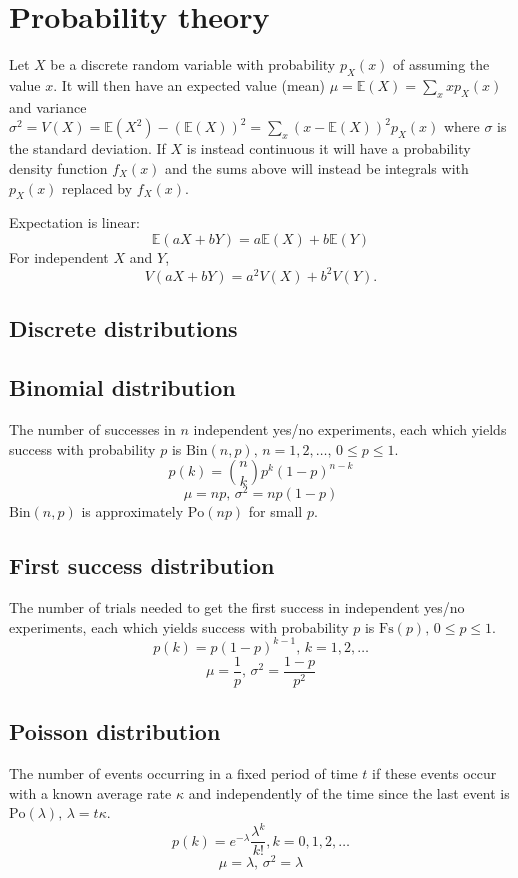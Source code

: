 \section{Probability theory}
Let $X$ be a discrete random variable with probability $p_X(x)$ of assuming the value $x$. It will then have an expected value (mean) $\mu=\mathbb{E}(X)=\sum_xxp_X(x)$ and variance $\sigma^2=V(X)=\mathbb{E}(X^2)-(\mathbb{E}(X))^2=\sum_x(x-\mathbb{E}(X))^2p_X(x)$ where $\sigma$ is the standard deviation. If $X$ is instead continuous it will have a probability density function $f_X(x)$ and the sums above will instead be integrals with $p_X(x)$ replaced by $f_X(x)$.

Expectation is linear:
\[\mathbb{E}(aX+bY) = a\mathbb{E}(X)+b\mathbb{E}(Y)\]
For independent $X$ and $Y$, \[V(aX+bY) = a^2V(X)+b^2V(Y).\]

\subsection{Discrete distributions}

\subsection{Binomial distribution}
The number of successes in $n$ independent yes/no experiments, each which yields success with probability $p$ is $\textrm{Bin}(n,p),\,n=1,2,\dots,\, 0\leq p\leq1$.
\[p(k)=\binom{n}{k}p^k(1-p)^{n-k}\]
\[\mu = np,\,\sigma^2=np(1-p)\]
$\textrm{Bin}(n,p)$ is approximately $\textrm{Po}(np)$ for small $p$.

\subsection{First success distribution}
The number of trials needed to get the first success in independent yes/no experiments, each which yields success with probability $p$ is $\textrm{Fs}(p),\,0\leq p\leq1$.
\[p(k)=p(1-p)^{k-1},\,k=1,2,\dots\]
\[\mu = \frac1p,\,\sigma^2=\frac{1-p}{p^2}\]

\subsection{Poisson distribution}
The number of events occurring in a fixed period of time $t$ if these events occur with a known average rate $\kappa$ and independently of the time since the last event is $\textrm{Po}(\lambda),\,\lambda=t\kappa$.
\[p(k)=e^{-\lambda}\frac{\lambda^k}{k!}, k=0,1,2,\dots\]
\[\mu=\lambda,\,\sigma^2=\lambda\]


